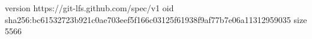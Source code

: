version https://git-lfs.github.com/spec/v1
oid sha256:bc61532723b921c0ae703eef5f166c03125f61938f9af77b7e06a11312959035
size 5566

